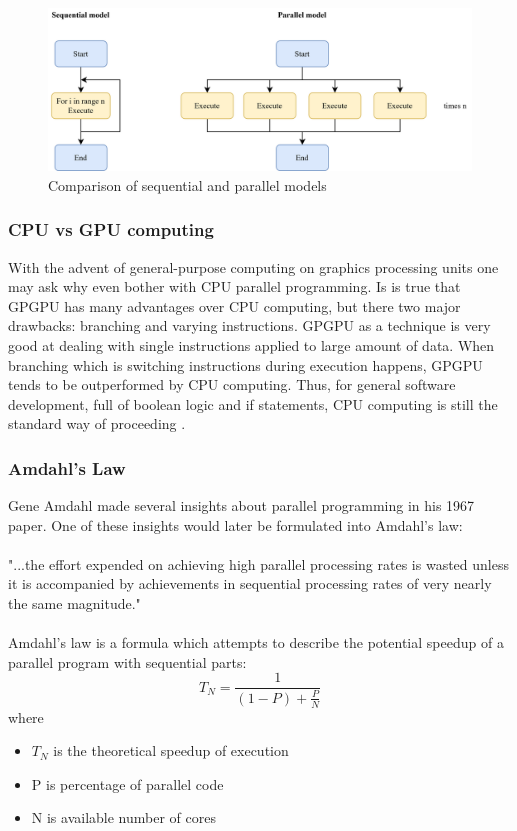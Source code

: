 \begin{figure}[htb]
	\centering
		\includegraphics[scale=1.0]{figures02/seqvspar.png}
		\caption{Comparison of sequential and parallel models}
	\label{fig:seqvspar}
\end{figure}

\subsubsection{CPU vs GPU computing}
With the advent of general-purpose computing on graphics processing units one may ask why even bother with CPU parallel programming. Is is true that GPGPU has many advantages over CPU computing, but there two major drawbacks: branching and varying instructions. GPGPU as a technique is very good at dealing with single instructions applied to large amount of data. When branching which is switching instructions during execution happens, GPGPU tends to be outperformed by CPU computing. Thus, for general software development, full of boolean logic and if statements, CPU computing is still the standard way of proceeding \cite{Tarditi2006}.

\pagebreak
\subsubsection{Amdahl's Law}
Gene Amdahl made several insights about parallel programming in his 1967 paper. \cite{Amdahl1967} One of these insights would later be formulated into Amdahl's law:
\\ \\ 
"...the effort expended on achieving high parallel processing rates is wasted unless it is accompanied by achievements in sequential processing rates of very nearly the same magnitude."
\\ \\
Amdahl's law is a formula which attempts to describe the potential speedup of a parallel program with sequential parts: 
\begin{equation}
T_N = \frac{1}{(1 - P) + \frac{P}{N}}
\end{equation}
where
\begin{itemize}
	\item $T_N$ is the theoretical speedup of execution
	\item P is percentage of parallel code
	\item N is available number of cores
\end{itemize}

